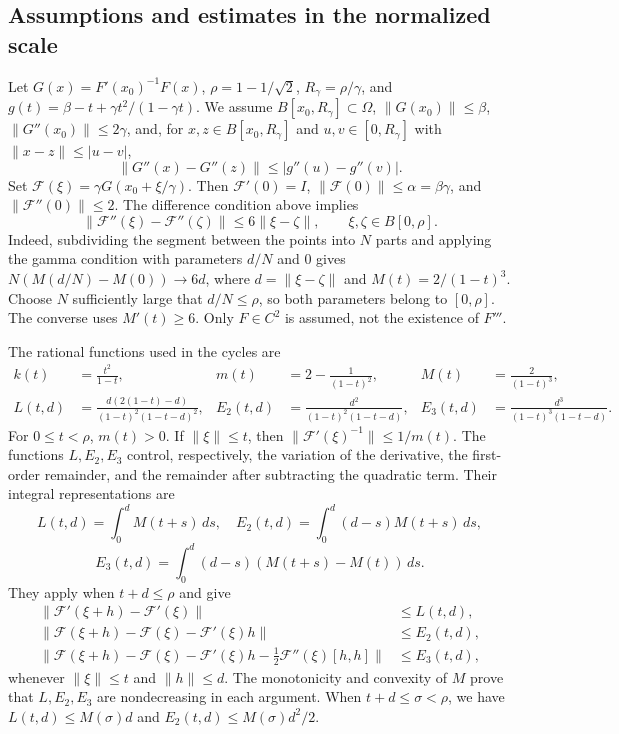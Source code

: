\documentclass[11pt,a4paper]{article}
\numberwithin{equation}{section}
\numberwithin{table}{section}
\theoremstyle{plain}
\theoremstyle{definition}\newtheorem{definition}[theorem]{Definition}
\theoremstyle{remark}\newtheorem{remark}[theorem]{Remark}
\begin{document}
\subsection{Assumptions and estimates in the normalized scale}
Let $G(x)=F'(x_0)^{-1}F(x)$,
$\rho=1-1/\sqrt2$, $R_\gamma=\rho/\gamma$, and
$g(t)=\beta-t+\gamma t^2/(1-\gamma t)$. We assume
$B[x_0,R_\gamma]\subset\Omega$, $\|G(x_0)\|\leq\beta$,
$\|G''(x_0)\|\leq2\gamma$, and, for
$x,z\in B[x_0,R_\gamma]$ and $u,v\in[0,R_\gamma]$ with
$\|x-z\|\leq|u-v|$,
\[
 \|G''(x)-G''(z)\|\leq|g''(u)-g''(v)|.
\]
Set $\mathcal F(\xi)=\gamma G(x_0+\xi/\gamma)$. Then
$\mathcal F'(0)=I$, $\|\mathcal F(0)\|\leq\alpha=\beta\gamma$,
and $\|\mathcal F''(0)\|\leq2$. The difference condition above implies
\begin{equation}
 \|\mathcal F''(\xi)-\mathcal F''(\zeta)\|\leq6\|\xi-\zeta\|,
 \qquad \xi,\zeta\in B[0,\rho].
 \label{supp:eq:normalized-Lipschitz}
\end{equation}
Indeed, subdividing the segment between the points into $N$ parts and
applying the gamma condition with parameters $d/N$ and $0$ gives
$N(M(d/N)-M(0))\to6d$, where $d=\|\xi-\zeta\|$ and
$M(t)=2/(1-t)^3$. Choose $N$ sufficiently large that $d/N\leq\rho$, so both parameters belong to $[0,\rho]$. The converse uses $M'(t)\geq6$.
Only $F\in C^2$ is assumed, not the existence of $F'''$.

The rational functions used in the cycles are
\begin{equation}
 \begin{aligned}
 k(t)&=\frac{t^2}{1-t},&m(t)&=2-\frac1{(1-t)^2},&M(t)&=\frac2{(1-t)^3},\\
 L(t,d)&=\frac{d(2(1-t)-d)}{(1-t)^2(1-t-d)^2},&
 E_2(t,d)&=\frac{d^2}{(1-t)^2(1-t-d)},&
 E_3(t,d)&=\frac{d^3}{(1-t)^3(1-t-d)}.
 \end{aligned}\label{supp:eq:rational-controls}
\end{equation}
For $0\leq t<\rho$, $m(t)>0$. If $\|\xi\|\leq t$, then
$\|\mathcal F'(\xi)^{-1}\|\leq1/m(t)$.
The functions $L,E_2,E_3$ control, respectively, the variation of the
derivative, the first-order remainder, and the remainder after
subtracting the quadratic term. Their integral representations are
\[
 L(t,d)=\int_0^dM(t+s)\,ds,\quad
 E_2(t,d)=\int_0^d(d-s)M(t+s)\,ds,
\]
\[
 E_3(t,d)=\int_0^d(d-s)(M(t+s)-M(t))\,ds.
\]
They apply when $t+d\leq\rho$ and give
\begin{equation}
\begin{aligned}
 \|\mathcal F'(\xi+h)-\mathcal F'(\xi)\|&\leq L(t,d),\\
 \|\mathcal F(\xi+h)-\mathcal F(\xi)-\mathcal F'(\xi)h\|&\leq E_2(t,d),\\
 \|\mathcal F(\xi+h)-\mathcal F(\xi)-\mathcal F'(\xi)h
 -\tfrac12\mathcal F''(\xi)[h,h]\|&\leq E_3(t,d),
\end{aligned}
\label{supp:eq:remainder-bounds}
\end{equation}
whenever $\|\xi\|\leq t$ and $\|h\|\leq d$. The monotonicity and
convexity of $M$ prove that $L,E_2,E_3$ are nondecreasing in each
argument. When $t+d\leq\sigma<\rho$, we have
$L(t,d)\leq M(\sigma)d$ and $E_2(t,d)\leq M(\sigma)d^2/2$.
\end{document}
